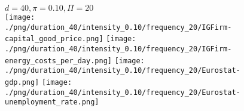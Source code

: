 \begin{figure}[ht!]
\centering\leavevmode
\begin{minipage}{13cm}
\centering\leavevmode
{$d=40, \pi=0.10, \Pi=20$}\\
\texttt{[image: ./png/duration\_40/intensity\_0.10/frequency\_20/IGFirm-capital\_good\_price.png]}
\texttt{[image: ./png/duration\_40/intensity\_0.10/frequency\_20/IGFirm-energy\_costs\_per\_day.png]}
\texttt{[image: ./png/duration\_40/intensity\_0.10/frequency\_20/Eurostat-gdp.png]}
\texttt{[image: ./png/duration\_40/intensity\_0.10/frequency\_20/Eurostat-unemployment\_rate.png]}
\end{minipage}
\end{figure}

